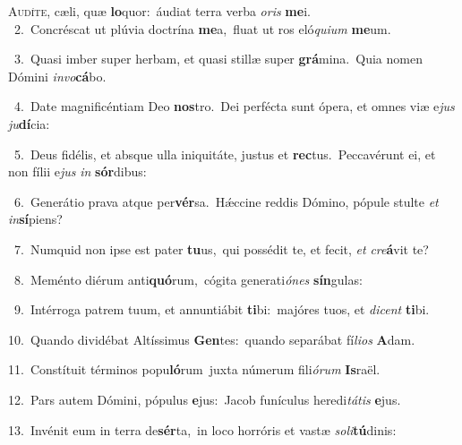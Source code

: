 \lettrine{\initial\textcolor{\initialcolor}{A}}{udíte,} cæli, quæ \textbf{lo}\-quor:~\star áudiat terra verba \textit{o}\-\textit{ris} \textbf{me}\-i.\\
{\numbfont\textcolor{\numbcolor}{~2.}}~Concréscat ut plúvia doctrína \textbf{me}\-a,~\star fluat ut ros eló\-\textit{qui}\-\textit{um} \textbf{me}\-um.\par
{\numbfont\textcolor{\numbcolor}{~3.}}~Quasi imber super herbam, et quasi stillæ super \textbf{grá}\-mina.~\star Quia nomen Dómini \textit{in}\-\textit{vo}\textbf{cá}bo.\par
{\numbfont\textcolor{\numbcolor}{~4.}}~Date magnificéntiam Deo \textbf{nos}\-tro.~\star Dei perfécta sunt ópera, et omnes viæ e\textit{jus} \textit{ju}\-\textbf{dí}cia:\par
{\numbfont\textcolor{\numbcolor}{~5.}}~Deus fidélis, et absque ulla iniquitáte, justus et \textbf{rec}\-tus.~\star Peccavérunt ei, et non fílii e\textit{jus} \textit{in} \textbf{sór}\-dibus:\par
{\numbfont\textcolor{\numbcolor}{~6.}}~Generátio prava atque per\-\textbf{vér}\-sa.~\star Hǽccine reddis Dómino, pópule stulte \textit{et} \textit{in}\-\textbf{sí}piens?\par
{\numbfont\textcolor{\numbcolor}{~7.}}~Numquid non ipse est pater \textbf{tu}\-us,~\star qui possédit te, et fecit, \textit{et} \textit{cre}\-\textbf{á}vit te?\par
{\numbfont\textcolor{\numbcolor}{~8.}}~Meménto diérum anti\-\textbf{quó}\-rum,~\star cógita generati\-\textit{ó}\-\textit{nes} \textbf{sín}\-gulas:\par
{\numbfont\textcolor{\numbcolor}{~9.}}~Intérroga patrem tuum, et annuntiábit \textbf{ti}\-bi:~\star majóres tuos, et \textit{di}\-\textit{cent} \textbf{ti}\-bi.\par
{\numbfont\textcolor{\numbcolor}{10.}}~Quando dividébat Altíssimus \textbf{Gen}\-tes:~\star quando separábat fí\-\textit{li}\-\textit{os} \textbf{A}\-dam.\par
{\numbfont\textcolor{\numbcolor}{11.}}~Constítuit términos popu\-\textbf{ló}\-rum~\star juxta númerum fili\-\textit{ó}\-\textit{rum} \textbf{Is}\-raël.\par
{\numbfont\textcolor{\numbcolor}{12.}}~Pars autem Dómini, pópulus \textbf{e}\-jus:~\star Jacob funículus heredi\-\textit{tá}\-\textit{tis} \textbf{e}\-jus.\par
{\numbfont\textcolor{\numbcolor}{13.}}~Invénit eum in terra de\-\textbf{sér}\-ta,~\star in loco horróris et vastæ \textit{so}\-\textit{li}\textbf{tú}dinis:\par
